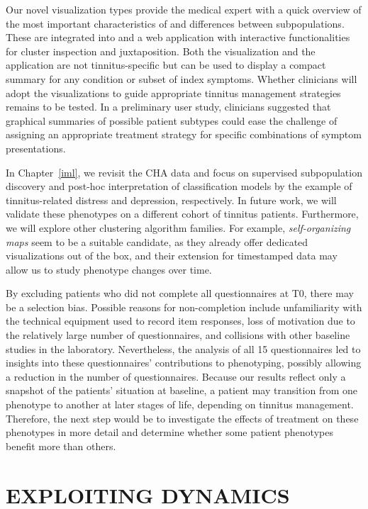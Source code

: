 \documentclass[
  oneside]{book}
\begin{document}
Our novel visualization types provide the medical expert with a quick overview of the most important characteristics of and differences between subpopulations.
These are integrated into and a web application with interactive functionalities for cluster inspection and juxtaposition.
Both the visualization and the application are not tinnitus-specific but can be used to display a compact summary for any condition or subset of index symptoms.
Whether clinicians will adopt the visualizations to guide appropriate tinnitus management strategies remains to be tested.
In a preliminary user study, clinicians suggested that graphical summaries of possible patient subtypes could ease the challenge of assigning an appropriate treatment strategy for specific combinations of symptom presentations.

In Chapter~\ref{iml}, we revisit the CHA data and focus on supervised subpopulation discovery and post-hoc interpretation of classification models by the example of tinnitus-related distress and depression, respectively.
In future work, we will validate these phenotypes on a different cohort of tinnitus patients.
Furthermore, we will explore other clustering algorithm families.
For example, \emph{self-organizing maps} \autocite{kohonen2012self} seem to be a suitable candidate, as they already offer dedicated visualizations \autocite{wehrens2018flexible} out of the box, and their extension for timestamped data \autocite{sarlin2013self} may allow us to study phenotype changes over time.

By excluding patients who did not complete all questionnaires at T0, there may be a selection bias.
Possible reasons for non-completion include unfamiliarity with the technical equipment used to record item responses, loss of motivation due to the relatively large number of questionnaires, and collisions with other baseline studies in the laboratory.
Nevertheless, the analysis of all 15 questionnaires led to insights into these questionnaires' contributions to phenotyping, possibly allowing a reduction in the number of questionnaires.
Because our results reflect only a snapshot of the patients' situation at baseline, a patient may transition from one phenotype to another at later stages of life, depending on tinnitus management.
Therefore, the next step would be to investigate the effects of treatment on these phenotypes in more detail and determine whether some patient phenotypes benefit more than others.

\hypertarget{part-exploiting-dynamics}{%
\part{EXPLOITING DYNAMICS}\label{part-exploiting-dynamics}}
\end{document}
